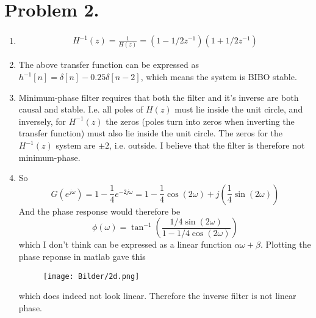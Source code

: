 \documentclass[a4paper,11pt,norsk]{article}
\begin{document}
\section*{Problem 2.}
\begin{enumerate}
    \item
        \begin{align*}
            H^{-1}(z) = \frac{1}{H(z)} = (1 - 1/2z^{-1})(1 + 1/2z^{-1})
        \end{align*}
    \item The above transfer function can be expressed as $h^{-1}[n] = \delta[n] - 0.25\delta[n - 2]$, which means the system is 
        BIBO stable.
    \item Minimum-phase filter requires that both the filter and it's inverse are both causal and stable. I.e. all poles of $H(z)$ must lie 
        inside the unit circle, and inversely, for $H^{-1}(z)$ the zeros (poles turn into zeros when inverting the transfer function) must also 
        lie inside the unit circle. The zeros for the $H^{-1}(z)$ system are $\pm 2$, i.e. outside. I believe that the filter is therefore 
        not minimum-phase.
    \item So
        \[
            G(e^{j\omega}) = 1 - \frac{1}{4}e^{-2j\omega} = 1 - \frac{1}{4}\cos(2\omega) + j\left(\frac{1}{4}\sin(2\omega)\right)
        \]
        And the phase response would therefore be
        \[
            \phi(\omega) = \tan^{-1}\left(\frac{1/4\sin(2\omega)}{1 - 1/4\cos(2\omega)}\right)
        \]
        which I don't think can be expressed as a linear function $\alpha \omega + \beta$. Plotting the phase reponse in matlab gave this
        \begin{figure}[H]
            \centering
            \texttt{[image: Bilder/2d.png]}
        \end{figure}
        which does indeed not look linear. Therefore the inverse filter is not linear phase.
\end{enumerate}
\end{document}
